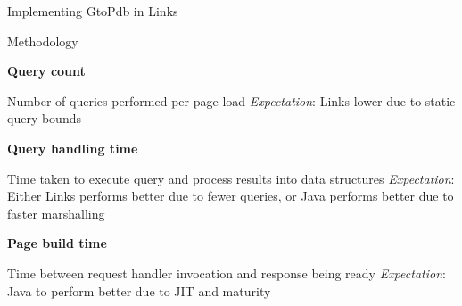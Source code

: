 \documentclass[11.5pt, aspectratio=169]{beamer}
\begin{document}
\begin{frame}{Implementing GtoPdb in Links}
\end{frame}


\begin{frame}{Methodology}

  \begin{fullpageitemize}
  \item<1->{\Large \textbf{Query count} }
    \begin{itemize}
      \itemR Number of queries performed per page load
      \itemR \emph{Expectation}: Links lower due to static query bounds
    \end{itemize}
    \vspace{1em}
  \item<2->{\Large \textbf{Query handling time} }
    \begin{itemize}
      \itemR Time taken to execute query and process results into data
        structures
      \itemR \emph{Expectation}: Either Links performs better due to fewer queries, or
        Java performs better due to faster marshalling
    \end{itemize}
    \vspace{1em}
  \item<3->{\Large \textbf{Page build time} }
    \begin{itemize}
      \itemR Time between request handler invocation and response being ready
      \itemR \emph{Expectation}: Java to perform better due to JIT and maturity
    \end{itemize}
  \end{fullpageitemize}
    \vspace{1em}

\end{frame}
\end{document}
